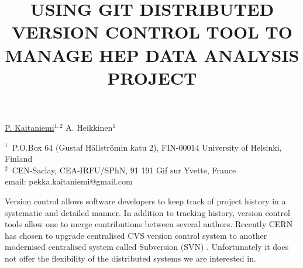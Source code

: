 \documentclass[12pt]{article}
\begin{document}
\title{USING GIT DISTRIBUTED VERSION CONTROL TOOL TO MANAGE HEP DATA ANALYSIS PROJECT}
\underline{P. Kaitaniemi}$^{1, 2}$ A. Heikkinen$^1$ 

$^1$~P.O.Box 64 (Gustaf H\"allstr\"omin katu 2), FIN-00014 University of Helsinki, Finland\\
$^2$~CEN-Saclay, CEA-IRFU/SPhN, 91 191 Gif sur Yvette, France \\
email: pekka.kaitaniemi@gmail.com

\vspace{\baselineskip}

Version control allows software developers to keep track of project history in
a systematic and detailed manner. 
In addition to tracking history, version control tools allow
one to merge contributions between several authors.
Recently CERN has chosen to upgrade centralised CVS version control
system \cite{cernsvn} to another modernised centralised system called Subversion (SVN) \cite{svnsite}.
Unfortunately it does not offer the flexibility of the
distributed systems we are interested in. 

\end{document}
